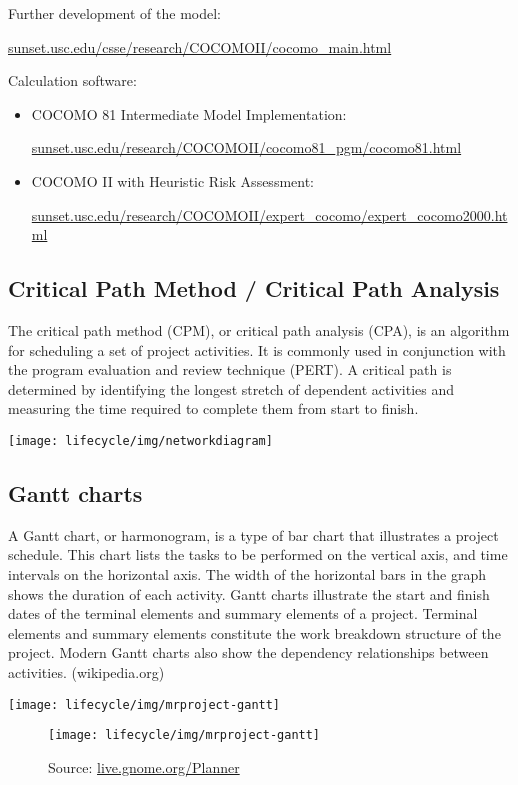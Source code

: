 Further development of the model:

\href{http://sunset.usc.edu/csse/research/COCOMOII/cocomo_main.html}
  {sunset.usc.edu/csse/research/COCOMOII/cocomo\_main.html}

\newslide
Calculation software:
\begin{itemize}
\item  COCOMO 81 Intermediate Model Implementation:

  \href{http://sunset.usc.edu/research/COCOMOII/cocomo81_pgm/cocomo81.html}
  {sunset.usc.edu/research/COCOMOII/cocomo81\_pgm/cocomo81.html}

\item COCOMO II with Heuristic Risk Assessment:

  \href{http://sunset.usc.edu/research/COCOMOII/expert_cocomo/expert_cocomo2000.html}{sunset.usc.edu/research/COCOMOII/expert\_cocomo/expert\_cocomo2000.html}
\end{itemize}
\newpage
\subsection{Critical Path Method / Critical Path Analysis}
The critical path method (CPM), or critical path analysis (CPA),
is an algorithm for scheduling a set of project activities.
It is commonly used in conjunction with the program evaluation and
review technique (PERT). A critical path is determined by identifying
the longest stretch of dependent activities and measuring the time
required to complete them from start to finish.\\

\vspace{4mm}

\texttt{[image: lifecycle/img/networkdiagram]}
%
\newslide
\newpage

\subsection{Gantt charts}
A Gantt chart, or harmonogram, is a type of bar chart that illustrates
a project schedule. This chart lists the tasks to be performed on the
vertical axis, and time intervals on the horizontal axis. The width
of the horizontal bars in the graph shows the duration of each
activity. Gantt charts illustrate the start and finish dates of the
terminal elements and summary elements of a project. Terminal elements
and summary elements constitute the work breakdown structure of the
project. Modern Gantt charts also show the dependency
relationships between activities. (wikipedia.org)
\ifslides
\begin{center}
\texttt{[image: lifecycle/img/mrproject-gantt]}
\end{center}
\else
\vspace{0.5cm}
\begin{figure}[H]
\texttt{[image: lifecycle/img/mrproject-gantt]}
\caption{Source: \href{http://live.gnome.org/Planner}
               {live.gnome.org/Planner}}
\end{figure}
\fi

